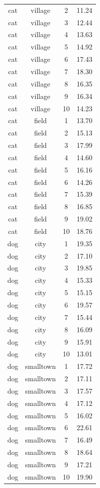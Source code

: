 \documentclass[
  letterpaper,
  DIV=11,
  oneside]{scrreport}
\begin{document}
\begin{longtable}[]{@{}cccc@{}}
cat & village & 2 & 11.24 \\
cat & village & 3 & 12.44 \\
cat & village & 4 & 13.63 \\
cat & village & 5 & 14.92 \\
cat & village & 6 & 17.43 \\
cat & village & 7 & 18.30 \\
cat & village & 8 & 16.35 \\
cat & village & 9 & 16.34 \\
cat & village & 10 & 14.23 \\
cat & field & 1 & 13.70 \\
cat & field & 2 & 15.13 \\
cat & field & 3 & 17.99 \\
cat & field & 4 & 14.60 \\
cat & field & 5 & 16.16 \\
cat & field & 6 & 14.26 \\
cat & field & 7 & 15.39 \\
cat & field & 8 & 16.85 \\
cat & field & 9 & 19.02 \\
cat & field & 10 & 18.76 \\
dog & city & 1 & 19.35 \\
dog & city & 2 & 17.10 \\
dog & city & 3 & 19.85 \\
dog & city & 4 & 15.33 \\
dog & city & 5 & 15.15 \\
dog & city & 6 & 19.57 \\
dog & city & 7 & 15.44 \\
dog & city & 8 & 16.09 \\
dog & city & 9 & 15.91 \\
dog & city & 10 & 13.01 \\
dog & smalltown & 1 & 17.72 \\
dog & smalltown & 2 & 17.11 \\
dog & smalltown & 3 & 17.57 \\
dog & smalltown & 4 & 17.12 \\
dog & smalltown & 5 & 16.02 \\
dog & smalltown & 6 & 22.61 \\
dog & smalltown & 7 & 16.49 \\
dog & smalltown & 8 & 18.64 \\
dog & smalltown & 9 & 17.21 \\
dog & smalltown & 10 & 19.90 \\

\end{longtable}
\end{document}
